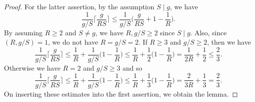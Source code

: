 \documentclass[hidelinks]{amsart}
\numberwithin{equation}{section}
\theoremstyle{plain}
\theoremstyle{definition}
\begin{document}
\begin{proof}
For the latter assertion,
by the assumption $S\mid g$,
we have
\[
\frac{1}{g/S}\biggl\lceil\frac{g}{RS}\biggr\rceil
\le
\frac{1}{g/S}\biggl(\frac{g}{RS}+1-\frac{1}{R}\biggr).
\]
By assuming $R\ge 2$ and $S\neq g$, we have $R,g/S\ge2$ since $S\mid g$.
Also, since $(R,g/S)=1$, we do not have $R=g/S=2$.
If $R\ge3$ and $g/S\ge2$, then we have
\[
\frac{1}{g/S}\biggl\lceil\frac{g}{RS}\biggr\rceil
\le
\frac{1}{R}
+
\frac{1}{g/S}\biggl(1-\frac{1}{R}\biggr)
\le
\frac{1}{R}
+
\frac{1}{2}\biggl(1-\frac{1}{R}\biggr)
=
\frac{1}{2R}+\frac{1}{2}
\le
\frac{2}{3}.
\]
Otherwise we have $R=2$ and $g/S\ge3$ and so
\[
\frac{1}{g/S}\biggl\lceil\frac{g}{RS}\biggr\rceil
\le
\frac{1}{R}
+
\frac{1}{g/S}\biggl(1-\frac{1}{R}\biggr)
\le
\frac{1}{R}
+
\frac{1}{3}\biggl(1-\frac{1}{R}\biggr)
=
\frac{2}{3R}+\frac{1}{3}
=
\frac{2}{3}.
\]
On inserting these estimates into the first assertion, we obtain the lemma.
\end{proof}
\end{document}
